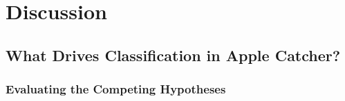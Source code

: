 \chapter{Discussion}
\label{ch:discussion}

%
%


\section{What Drives Classification in Apple Catcher?}
\label{sec:discuss_primary}



\subsection{Evaluating the Competing Hypotheses}
\label{subsec:discuss_hypotheses}

%
%
%
%
%
%
%
%
%
%


